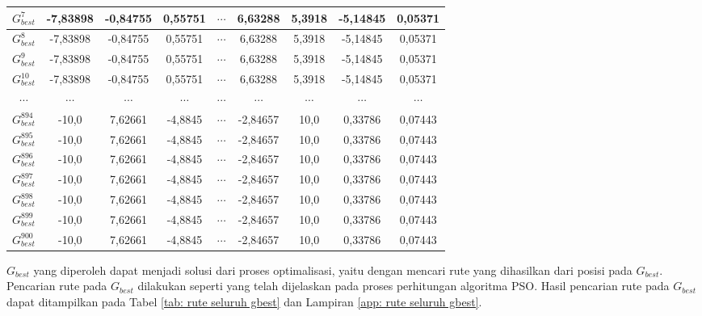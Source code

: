{{{\begin{tabularx}{\textwidth}{|c|c|c|c|c|c|c|c|c|}
    $G_{best}^{7}$   & -7,83898 & -0,84755 & 0,55751  & $\cdots$ & 6,63288  & 5,3918   & -5,14845 & 0,05371       \\ \hline
    $G_{best}^{8}$   & -7,83898 & -0,84755 & 0,55751  & $\cdots$ & 6,63288  & 5,3918   & -5,14845 & 0,05371       \\ \hline
    $G_{best}^{9}$   & -7,83898 & -0,84755 & 0,55751  & $\cdots$ & 6,63288  & 5,3918   & -5,14845 & 0,05371       \\ \hline
    $G_{best}^{10}$  & -7,83898 & -0,84755 & 0,55751  & $\cdots$ & 6,63288  & 5,3918   & -5,14845 & 0,05371       \\ \hline
    $\cdots$         & $\cdots$ & $\cdots$ & $\cdots$ & $\cdots$ & $\cdots$ & $\cdots$ & $\cdots$ & $\cdots$      \\ \hline
    $G_{best}^{894}$ & -10,0    & 7,62661  & -4,8845  & $\cdots$ & -2,84657 & 10,0     & 0,33786  & 0,07443       \\ \hline
    $G_{best}^{895}$ & -10,0    & 7,62661  & -4,8845  & $\cdots$ & -2,84657 & 10,0     & 0,33786  & 0,07443       \\ \hline
    $G_{best}^{896}$ & -10,0    & 7,62661  & -4,8845  & $\cdots$ & -2,84657 & 10,0     & 0,33786  & 0,07443       \\ \hline
    $G_{best}^{897}$ & -10,0    & 7,62661  & -4,8845  & $\cdots$ & -2,84657 & 10,0     & 0,33786  & 0,07443       \\ \hline
    $G_{best}^{898}$ & -10,0    & 7,62661  & -4,8845  & $\cdots$ & -2,84657 & 10,0     & 0,33786  & 0,07443       \\ \hline
    $G_{best}^{899}$ & -10,0    & 7,62661  & -4,8845  & $\cdots$ & -2,84657 & 10,0     & 0,33786  & 0,07443       \\ \hline
    $G_{best}^{900}$ & -10,0    & 7,62661  & -4,8845  & $\cdots$ & -2,84657 & 10,0     & 0,33786  & 0,07443       \\ \hline
\end{tabularx}
}

$G_{best}$ yang diperoleh dapat menjadi solusi dari proses optimalisasi, yaitu dengan mencari rute yang dihasilkan dari posisi pada $G_{best}$.
Pencarian rute pada $G_{best}$ dilakukan seperti yang telah dijelaskan pada proses perhitungan algoritma PSO.
Hasil pencarian rute pada $G_{best}$ dapat ditampilkan pada Tabel \ref{tab: rute seluruh gbest} dan Lampiran \ref{app: rute seluruh gbest}.

}}
